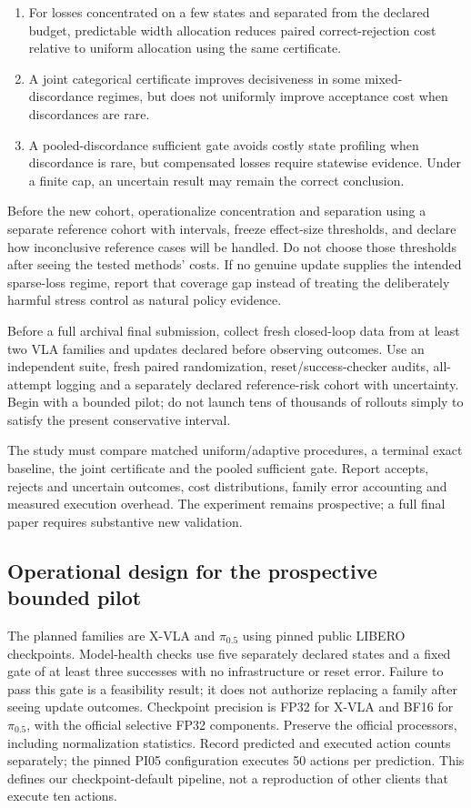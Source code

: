 \documentclass[conference]{IEEEtran}
\begin{document}
\begin{enumerate}
\item For losses concentrated on a few states and separated from the declared
budget, predictable width allocation reduces paired correct-rejection cost
relative to uniform allocation using the same certificate.
\item A joint categorical certificate improves decisiveness in some mixed-
discordance regimes, but does not uniformly improve acceptance cost when
discordances are rare.
\item A pooled-discordance sufficient gate avoids costly state profiling when
discordance is rare, but compensated losses require statewise evidence.
Under a finite cap, an uncertain result may remain the correct conclusion.

\end{enumerate}
Before the new cohort, operationalize concentration and separation using a separate reference cohort with intervals, freeze effect-size thresholds, and declare how inconclusive reference cases will be handled. Do not choose those thresholds after seeing the tested methods' costs. If no genuine update supplies the intended sparse-loss regime, report that coverage gap instead of treating the deliberately harmful stress control as natural policy evidence.

Before a full archival final submission, collect fresh closed-loop data from at least two VLA families and updates declared before observing outcomes. Use an independent suite, fresh paired randomization, reset/success-checker audits, all-attempt logging and a separately declared reference-risk cohort with uncertainty. Begin with a bounded pilot; do not launch tens of thousands of rollouts simply to satisfy the present conservative interval.

The study must compare matched uniform/adaptive procedures, a terminal exact baseline, the joint certificate and the pooled sufficient gate. Report accepts, rejects and uncertain outcomes, cost distributions, family error accounting and measured execution overhead. The experiment remains prospective; a full final paper requires substantive new validation.

\subsection{Operational design for the prospective bounded pilot}

The planned families are X-VLA and $\pi_{0.5}$ using pinned public LIBERO checkpoints. Model-health checks use five separately declared states and a fixed gate of at least three successes with no infrastructure or reset error. Failure to pass this gate is a feasibility result; it does not authorize replacing a family after seeing update outcomes. Checkpoint precision is FP32 for X-VLA and BF16 for $\pi_{0.5}$, with the official selective FP32 components. Preserve the official processors, including normalization statistics. Record predicted and executed action counts separately; the pinned PI05 configuration executes 50 actions per prediction. This defines our checkpoint-default pipeline, not a reproduction of other clients that execute ten actions.
\end{document}
